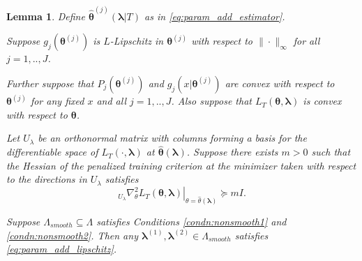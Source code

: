 \documentclass[12pt]{article} %
\newtheorem{lemma}{Lemma}
\theoremstyle{definition}
\begin{document}
\begin{lemma}
	\label{lemma:nonsmooth}
	Define $\hat{\boldsymbol{\theta}}^{(j)}\left (\boldsymbol{\lambda} | T\right )$ as in \eqref{eq:param_add_estimator}.
	
	\noindent
	Suppose $g_j(\boldsymbol{\theta}^{(j)})$ is $L$-Lipschitz in $\boldsymbol{\theta}^{(j)}$ with respect to $\| \cdot \|_\infty$ for all $j=1,..,J$.
	
	\noindent		
	Further suppose that $P_j(\boldsymbol{\theta}^{(j)})$ and $g_j(x | \boldsymbol{\theta}^{(j)})$ are convex with respect to $\boldsymbol{\theta}^{(j)}$ for any fixed $x$ and all $j=1,..,J$.
	Also suppose that $L_T\left ( \boldsymbol{\theta} , \boldsymbol{\lambda} \right )$ is convex with respect to $\boldsymbol{\theta}$.
	
	Let $U_\lambda$ be an orthonormal matrix with columns forming a basis for the differentiable space of $L_T(\cdot , \boldsymbol{\lambda})$ at $\hat{\boldsymbol{\theta}}(\boldsymbol{\lambda})$. Suppose there exists $m > 0$ such that the Hessian of the penalized training criterion at the minimizer taken with respect to the directions in $U_\lambda$ satisfies 
	\begin{equation}
	\left . _{U_\lambda}\nabla_{\theta}^2 L_T(\boldsymbol{\theta}, \boldsymbol{\lambda}) \right |_{\theta = \hat{\theta}(\boldsymbol{\lambda})} \succeq mI.
	\end{equation}
	
	Suppose $\Lambda_{smooth} \subseteq \Lambda$ satisfies Conditions \ref{condn:nonsmooth1} and \ref{condn:nonsmooth2}. Then any $\boldsymbol{\lambda}^{(1)}, \boldsymbol{\lambda}^{(2)} \in \Lambda_{smooth}$ satisfies  \eqref{eq:param_add_lipschitz}.
\end{lemma}
\end{document}
